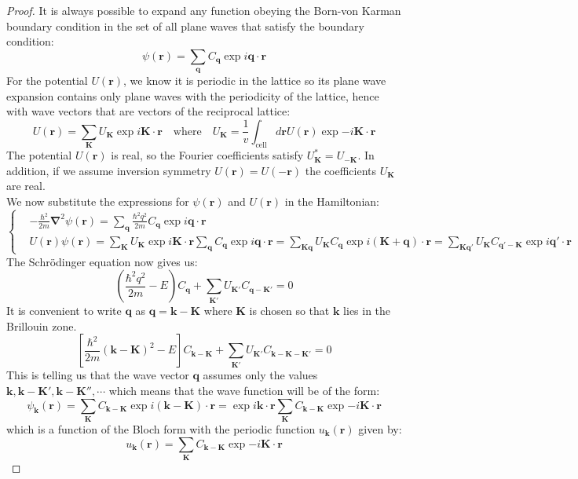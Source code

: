 \documentclass[10.75pt,a4paper,openright,bottom=2cm]{article}
\renewcommand{\Vec}[1]{\boldsymbol{#1}}
\begin{document}
\begin{proof}
It is always possible to expand any function obeying the Born-von Karman boundary condition in the set of all plane waves that satisfy the boundary condition:
\[
\psi(\Vec{r})=\sum_{\Vec{q}}C_{\Vec{q}}\exp{i\Vec{q}\cdot\Vec{r}}
\]
For the potential $U(\Vec{r})$, we know it is periodic in the lattice so its plane wave expansion contains only plane waves with the periodicity of the lattice, hence with wave vectors that are vectors of the reciprocal lattice:
\[
U(\Vec{r})=\sum_{\Vec{K}}U_{\Vec{K}}\exp{i\Vec{K}\cdot\Vec{r}} \quad \text{where} \quad U_{\Vec{K}}=\frac{1}{v}\int_{\text{cell}}d\Vec{r}U(\Vec{r})\exp{-i\Vec{K}\cdot\Vec{r}}
\]
The potential $U(\Vec{r})$ is real, so the Fourier coefficients satisfy $U_{\Vec{K}}^*=U_{-\Vec{K}}$. In addition, if we assume inversion symmetry $U(\Vec{r})=U(-\Vec{r})$ the coefficients $U_{\Vec{K}}$ are real.\\
We now substitute the expressions for $\psi(\Vec{r})$ and $U(\Vec{r})$ in the Hamiltonian:
\[
\left\{
\begin{aligned}
&-\frac{\hbar^2}{2m}\Vec{\nabla}^2\psi(\Vec{r})=\sum_{\Vec{q}}\frac{\hbar^2q^2}{2m}C_{\Vec{q}}\exp{i\Vec{q}\cdot\Vec{r}}\\
&U(\Vec{r})\psi(\Vec{r})=\sum_{\Vec{K}}U_{\Vec{K}}\exp{i\Vec{K}\cdot\Vec{r}}\sum_{\Vec{q}}C_{\Vec{q}}\exp{i\Vec{q}\cdot\Vec{r}}=\sum_{\Vec{K}\Vec{q}}U_{\Vec{K}}C_{\Vec{q}}\exp{i(\Vec{K}+\Vec{q})\cdot\Vec{r}}=\sum_{\Vec{K}\Vec{q'}}U_{\Vec{K}}C_{\Vec{q'}-\Vec{K}}\exp{i\Vec{q'}\cdot\Vec{r}}
\end{aligned}
\right.
\]
The Schr\"odinger equation now gives us:
\[
\left(\frac{\hbar^2q^2}{2m}-E\right)C_{\Vec{q}}+\sum_{\Vec{K'}}U_{\Vec{K'}}C_{\Vec{q}-\Vec{K'}}=0
\]
It is convenient to write $\Vec{q}$ as $\Vec{q}=\Vec{k}-\Vec{K}$ where $\Vec{K}$ is chosen so that $\Vec{k}$ lies in the  Brillouin zone.
\begin{equation}
\label{central}
\left[\frac{\hbar^2}{2m}(\Vec{k}-\Vec{K})^2-E\right]C_{\Vec{k}-\Vec{K}}+\sum_{\Vec{K'}}U_{\Vec{K'}}C_{\Vec{k}-\Vec{K}-\Vec{K'}}=0
\end{equation}
This is telling us that the wave vector $\Vec{q}$ assumes only the values $\Vec{k},\Vec{k}-\Vec{K'}, \Vec{k}-\Vec{K''},\cdots$ which means that the wave function will be of the form:
\[
\psi_{\Vec{k}}(\Vec{r})=\sum_{\Vec{K}}C_{\Vec{k}-\Vec{K}}\exp{i(\Vec{k}-\Vec{K})\cdot\Vec{r}}=\exp{i\Vec{k}\cdot\Vec{r}}\sum_{\Vec{K}}C_{\Vec{k}-\Vec{K}}\exp{-i\Vec{K}\cdot\Vec{r}}
\]
which is a function of the Bloch form with the periodic function $u_{\Vec{k}}(\Vec{r})$ given by:
\[
u_{\Vec{k}}(\Vec{r})=\sum_{\Vec{K}}C_{\Vec{k}-\Vec{K}}\exp{-i\Vec{K}\cdot\Vec{r}}
\]
\end{proof}
\end{document}
